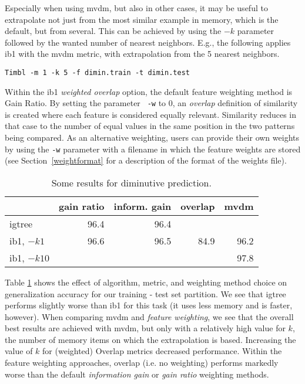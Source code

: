 \documentclass{report}
\begin{document}
Especially when using {\sc mvdm}, but also in other cases, it may be
useful to extrapolate not just from the most similar example in
memory, which is the default, but from several. This can be achieved
by using the $-k$ parameter followed by the wanted number of nearest
neighbors. E.g., the following applies {\sc ib1} with the {\sc mvdm}
metric, with extrapolation from the 5 nearest neighbors.

{\small
\begin{verbatim}
Timbl -m 1 -k 5 -f dimin.train -t dimin.test
\end{verbatim}
}

Within the {\sc ib1} {\em weighted overlap} option, the default
feature weighting method is Gain Ratio. By setting the parameter {\tt
-w} to 0, an {\em overlap} definition of similarity is created where
each feature is considered equally relevant. Similarity reduces in
that case to the number of equal values in the same position in the
two patterns being compared. As an alternative weighting, users can
provide their own weights by using the {\tt -w} parameter with a
filename in which the feature weights are stored (see
Section~\ref{weightformat} for a description of the format of the
weights file).

\begin{table}
\begin{tabular}{|l|r|r|r|r|}\hline
             & gain ratio & inform. gain & overlap & {\sc mvdm} \\
\hline
{\sc igtree} & 96.4 & 96.4 &  & \\
{\sc ib1}, $-k1$ & 96.6 & 96.5 & 84.9 & 96.2 \\
{\sc ib1}, $-k10$ & & & & 97.8 \\
\hline
\end{tabular}
\caption{Some results for diminutive prediction.}
\label{diminresults}
\end{table}

Table \ref{diminresults} shows the effect of algorithm, metric, and
weighting method choice on generalization accuracy for our training -
test set partition. We see that {\sc igtree} performs slightly worse
than {\sc ib1} for this task (it uses less memory and is faster,
however). When comparing {\sc mvdm} and {\em feature weighting}, we
see that the overall best results are achieved with {\sc mvdm}, but
only with a relatively high value for $k$, the number of memory items
on which the extrapolation is based. Increasing the value of $k$ for
(weighted) Overlap metrics decreased performance. Within the feature
weighting approaches, overlap (i.e. no weighting) performs markedly
worse than the default {\em information gain} or {\em gain ratio}
weighting methods.
\end{document}
